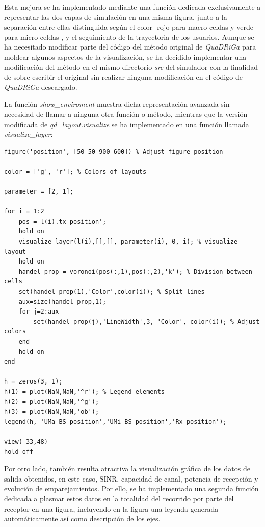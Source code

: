 Esta mejora se ha implementado mediante una función dedicada exclusivamente a representar las dos capas de simulación en una misma figura, junto a la separación entre ellas distinguida según el color -rojo para macro-celdas y verde para micro-celdas-, y el seguimiento de la trayectoria de los usuarios. Aunque se ha necesitado modificar parte del código del método original de \textit{QuaDRiGa} para moldear algunos aspectos de la visualización, se ha decidido implementar una modificación del método en el mismo directorio \textit{src} del simulador con la finalidad de sobre-escribir el original sin realizar ninguna modificación en el código de \textit{QuaDRiGa} descargado.

La función \textit{show\_enviroment} muestra dicha representación avanzada sin necesidad de llamar a ninguna otra función o método, mientras que la versión modificada de \textit{qd\_layout.visualize} se ha implementado en una función llamada \textit{visualize\_layer}:

\begin{lstlisting}[style=Matlab-editor, basicstyle=\tiny]
figure('position', [50 50 900 600]) % Adjust figure position

color = ['g', 'r']; % Colors of layouts
    
parameter = [2, 1];
    
for i = 1:2
    pos = l(i).tx_position';
    hold on
    visualize_layer(l(i),[],[], parameter(i), 0, i); % visualize layout
    hold on
    handel_prop = voronoi(pos(:,1),pos(:,2),'k'); % Division between cells
    set(handel_prop(1),'Color',color(i)); % Split lines
    aux=size(handel_prop,1);
    for j=2:aux
        set(handel_prop(j),'LineWidth',3, 'Color', color(i)); % Adjust colors
    end
    hold on
end
    
h = zeros(3, 1);
h(1) = plot(NaN,NaN,'^r'); % Legend elements
h(2) = plot(NaN,NaN,'^g');
h(3) = plot(NaN,NaN,'ob');
legend(h, 'UMa BS position','UMi BS position','Rx position');
    
view(-33,48)
hold off
\end{lstlisting}

Por otro lado, también resulta atractiva la visualización gráfica de los datos de salida obtenidos, en este caso, SINR, capacidad de canal, potencia de recepción y evolución de emparejamientos. Por ello, se ha implementado una segunda función dedicada a plasmar estos datos en la totalidad del recorrido por parte del receptor en una figura, incluyendo en la figura una leyenda generada automáticamente así como descripción de los ejes.

